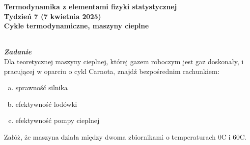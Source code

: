 \documentclass[11pt,a4paper]{article}
\newcounter{zadanie}\newcommand{\zadanie}[1][]{\addtocounter{zadanie}{1} ~\\  {\bf \emph{Zadanie \arabic{zadanie} #1 }} \\}
\begin{document}

\begin{centering}
\bf{\Large{Termodynamika z elementami fizyki statystycznej}}\\
Tydzień 7 (7 kwietnia 2025)\\[3mm]
Cykle termodynamiczne, maszyny cieplne\\
\end{centering} 
\vspace{5mm}

\zadanie
Dla teoretycznej maszyny cieplnej, której gazem roboczym jest gaz doskonały, 
i pracującej w oparciu o cykl Carnota, znajdź bezpośrednim rachunkiem:
\begin{enumerate}[a)]
\item sprawność silnika
\item efektywność lodówki
\item efektywność pompy cieplnej
\end{enumerate}
Załóż, że maszyna działa między dwoma zbiornikami o temperaturach 0\degree C i 60\degree C.\\
\end{document}
